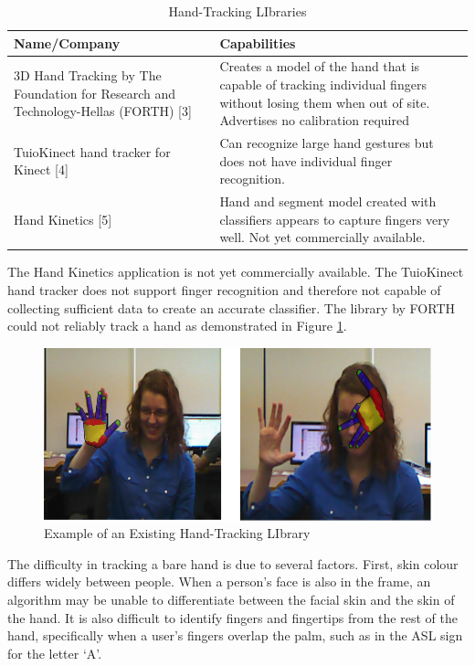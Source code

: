 \documentclass[12pt]{article}
\begin{document}
\begin{table}[h!]
\centering
\caption{Hand-Tracking LIbraries}
\label{table:libraries}
\vspace{1em}
\begin{tabular}{|p{5cm}| p{11cm} |}
\hline
\textbf{Name/Company} & \textbf{Capabilities} \\ \hline
3D Hand Tracking by The Foundation for Research and Technology-Hellas (FORTH) [3] &
Creates a model of the hand that is capable of tracking individual fingers without losing them when out of site.
Advertises no calibration required \\ \hline
TuioKinect hand tracker for Kinect [4] &
Can recognize large hand gestures but does not have individual finger recognition. \\ \hline
Hand Kinetics [5]  &
Hand and segment model created with classifiers appears to capture fingers very well. Not yet commercially available. \\ \hline
\end{tabular}
\end{table}


The Hand Kinetics application is not yet commercially available. The TuioKinect hand tracker does not support finger recognition and therefore not capable of collecting sufficient data to create an accurate classifier. The library by FORTH could not reliably track a hand as demonstrated in Figure \ref{fig:FORTH}. 

\begin{figure}[h]
  \centering
  \includegraphics[scale=1]{FORTH.png}
  \caption{Example of an Existing Hand-Tracking LIbrary}
  \label{fig:FORTH}
\end{figure}

The difficulty in tracking a bare hand is due to several factors. First, skin colour differs widely between people. When a person’s face is also in the frame, an algorithm may be unable to differentiate between the facial skin and the skin of the hand. It is also difficult to identify fingers and fingertips from the rest of the hand, specifically when a user’s fingers overlap the palm, such as in the ASL sign for the letter ‘A’.
\end{document}
